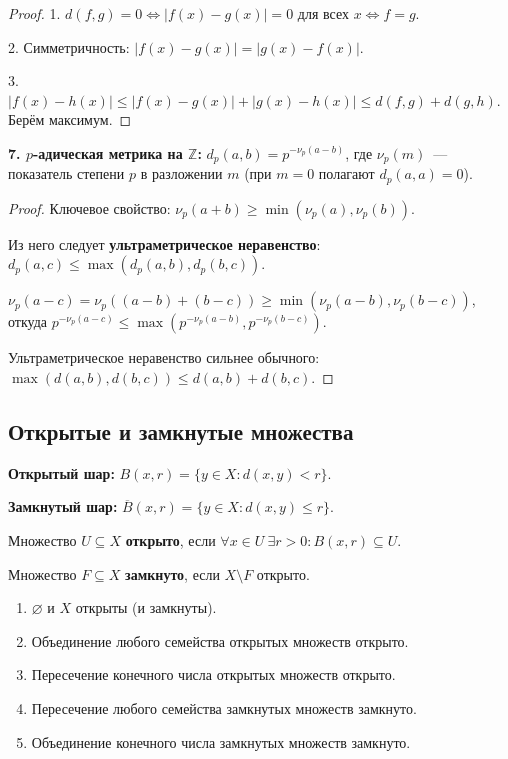 \documentclass[12pt]{article}
\begin{document}
	\begin{proof}
		1. $d(f,g) = 0 \Leftrightarrow |f(x) - g(x)| = 0$ для всех $x \Leftrightarrow f = g$.
		
		2. Симметричность: $|f(x) - g(x)| = |g(x) - f(x)|$.
		
		3. $|f(x) - h(x)| \leqslant |f(x) - g(x)| + |g(x) - h(x)| \leqslant d(f,g) + d(g,h)$. Берём максимум.
	\end{proof}
	
	\textbf{7. $p$-адическая метрика на $\mathbb{Z}$:} $d_p(a, b) = p^{-\nu_p(a-b)}$, где $\nu_p(m)$~--- показатель степени $p$ в разложении $m$ (при $m = 0$ полагают $d_p(a, a) = 0$).
	
	\begin{proof}
		Ключевое свойство: $\nu_p(a + b) \geqslant \min(\nu_p(a), \nu_p(b))$.
		
		Из него следует \textbf{ультраметрическое неравенство}: $d_p(a, c) \leqslant \max(d_p(a, b), d_p(b, c))$.
		
		$\nu_p(a - c) = \nu_p((a-b) + (b-c)) \geqslant \min(\nu_p(a-b), \nu_p(b-c))$, откуда $p^{-\nu_p(a-c)} \leqslant \max(p^{-\nu_p(a-b)}, p^{-\nu_p(b-c)})$.
		
		Ультраметрическое неравенство сильнее обычного: $\max(d(a,b), d(b,c)) \leqslant d(a,b) + d(b,c)$.
	\end{proof}
	
	\subsection{Открытые и замкнутые множества}
	
	\begin{definition}
		\textbf{Открытый шар:} $B(x, r) = \{y \in X : d(x, y) < r\}$.
		
		\textbf{Замкнутый шар:} $\overline{B}(x, r) = \{y \in X : d(x, y) \leqslant r\}$.
	\end{definition}
	
	\begin{definition}
		Множество $U \subseteq X$ \textbf{открыто}, если $\forall x \in U \ \exists r > 0: B(x, r) \subseteq U$.
		\end{definition}
	
	\begin{definition}
		Множество $F \subseteq X$ \textbf{замкнуто}, если $X \setminus F$ открыто.
	\end{definition}
	
	\begin{theorem}
		\begin{enumerate}
			\item $\varnothing$ и $X$ открыты (и замкнуты).
			\item Объединение любого семейства открытых множеств открыто.
			\item Пересечение конечного числа открытых множеств открыто.
			\item Пересечение любого семейства замкнутых множеств замкнуто.
			\item Объединение конечного числа замкнутых множеств замкнуто.
		\end{enumerate}
	\end{theorem}
	
\end{document}
